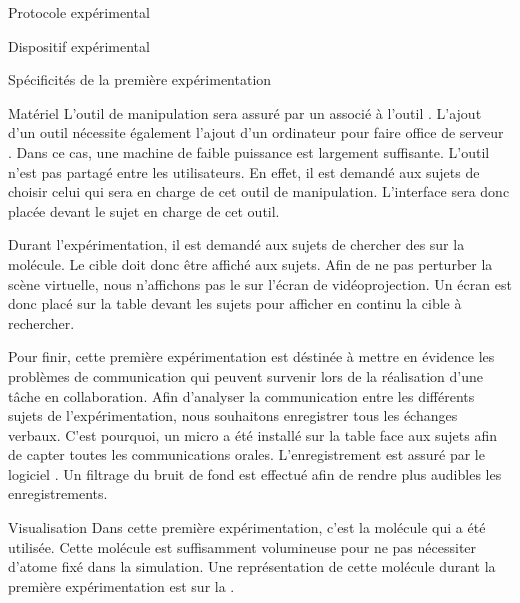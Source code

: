 \documentclass[myfrancais]{mythesis}
\begin{document}
\begin{mychapter}{Protocole expérimental}
\begin{mysection}{Dispositif expérimental}
\begin{mysubsection}{Spécificités de la première expérimentation}
\begin{mysubsubsection}{Matériel}
					L'outil de manipulation sera assuré par un \myOmni associé à l'outil  .
					L'ajout d'un outil nécessite également l'ajout d'un ordinateur pour faire office de serveur .
					Dans ce cas, une machine de faible puissance est largement suffisante.
					L'outil n'est pas partagé entre les utilisateurs.
					En effet, il est demandé aux sujets de choisir celui qui sera en charge de cet outil de manipulation.
					L'interface sera donc placée devant le sujet en charge de cet outil.

					Durant l'expérimentation, il est demandé aux sujets de chercher des  sur la molécule.
					Le  cible doit donc être affiché aux sujets.
					Afin de ne pas perturber la scène virtuelle, nous n'affichons pas le  sur l'écran de vidéoprojection.
					Un écran \myLCD {} est donc placé sur la table devant les sujets pour afficher en continu la cible à rechercher.

					Pour finir, cette première expérimentation est déstinée à mettre en évidence les problèmes de communication qui peuvent survenir lors de la réalisation d'une tâche en collaboration.
					Afin d'analyser la communication entre les différents sujets de l'expérimentation, nous souhaitons enregistrer tous les échanges verbaux.
					C'est pourquoi, un micro a été installé sur la table face aux sujets afin de capter toutes les communications orales.
					L'enregistrement est assuré par le logiciel \myAudacity.
					Un filtrage du bruit de fond est effectué \myafortiori afin de rendre plus audibles les enregistrements.
				\end{mysubsubsection}
				\begin{mysubsubsection}{Visualisation}
					Dans cette première expérimentation, c'est la molécule \myPrion qui a été utilisée.
					Cette molécule est suffisamment volumineuse pour ne pas nécessiter d'atome fixé dans la simulation.
					Une représentation de cette molécule durant la première expérimentation est sur la .


\end{mysubsubsection}
\end{mysubsection}
\end{mysection}
\end{mychapter}
\end{document}
